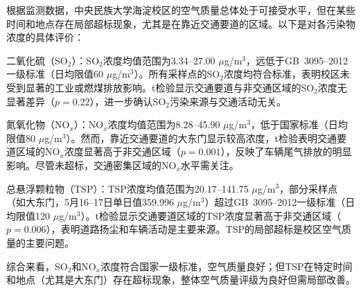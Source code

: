 \documentclass[12pt,hyperref,a4paper,UTF8]{ctexart}
\begin{document}
根据监测数据，中央民族大学海淀校区的空气质量总体处于可接受水平，但在某些时间和地点存在局部超标现象，尤其是在靠近交通要道的区域。以下是对各污染物浓度的具体评价：

二氧化硫（SO$_2$）：SO$_2$浓度均值范围为3.34–27.00 $\mu$g/m$^3$，远低于GB~3095--2012一级标准（日均限值60 $\mu$g/m$^3$）。所有采样点的SO$_2$浓度均符合标准，表明校区未受到显著的工业或燃煤排放影响。t检验显示交通要道与非交通区域的SO$_2$浓度无显著差异（$p=0.22$），进一步确认SO$_2$污染来源与交通活动无关。

氮氧化物（NO$_x$）：NO$_x$浓度均值范围为8.28–45.90 $\mu$g/m$^3$，低于国家标准（日均限值80 $\mu$g/m$^3$）。然而，靠近交通要道的大东门显示较高浓度，t检验表明交通要道区域的NO$_x$浓度显著高于非交通区域（$p=0.001$），反映了车辆尾气排放的明显影响。尽管未超标，交通密集区域的NO$_x$水平需关注。

总悬浮颗粒物（TSP）：TSP浓度均值范围为20.17–141.75 $\mu$g/m$^3$，部分采样点（如大东门，5月16–17日单日值359.996 $\mu$g/m$^3$）超过GB~3095--2012一级标准（日均限值120 $\mu$g/m$^3$）。t检验显示交通要道区域的TSP浓度显著高于非交通区域（$p=0.006$），表明道路扬尘和车辆活动是主要来源。TSP的局部超标是校区空气质量的主要问题。

综合来看，SO$_2$和NO$_x$浓度符合国家一级标准，空气质量良好；但TSP在特定时间和地点（尤其是大东门）存在超标现象，整体空气质量评级为良好但需局部改善。

\end{document}

